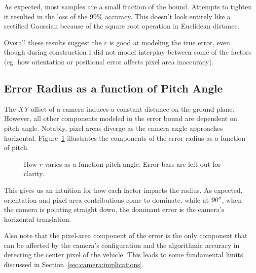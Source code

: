 \documentclass[a4paper,12pt,twoside,openright]{report}
\begin{document}

As expected, most samples are a small fraction of the bound. Attempts to tighten it resulted in 
the loss of the 99\% accuracy. This doesn't look entirely like a rectified Gaussian because
of the square root operation in Euclidean distance.

Overall these results suggest the $r$ is good at modeling the true error, even though during construction
I did not model interplay between some of the factors (eg. how orientation 
or positional error affects pixel area inaccuracy).

\subsection{Error Radius as a function of Pitch Angle}

The \textit{XY} offset of a camera induces a constant distance on the ground plane. However,
all other components modeled in the error bound are dependent on pitch angle. Notably,
pixel areas diverge as the camera angle approaches horizontal. Figure~\ref{fig:camera:radius versus pitch}
illustrates the components of the error radius as a function of pitch.

\begin{figure}[htb]
    \begin{center}
        \resizebox{.95\linewidth}{!}{}
    \end{center}
    \caption[$r$ as a Function of Pitch Angle]{How $r$ varies as a function pitch angle. Error bars are left out for clarity.}
    \label{fig:camera:radius versus pitch}
\end{figure}


This gives us an intuition for how each factor impacts the radius.
As expected, orientation and pixel area contributions
come to dominate, while at $90\degree$, when the camera is pointing straight down, the dominant
error is the camera's horizontal translation.

Also note that the pixel-area component of the error is the only component that
can be affected by the camera's configuration and the algorithmic 
accuracy in detecting the center pixel of the vehicle. This leads
to some fundamental limits discussed in Section~\ref{sec:camera:implications}.
\end{document}

